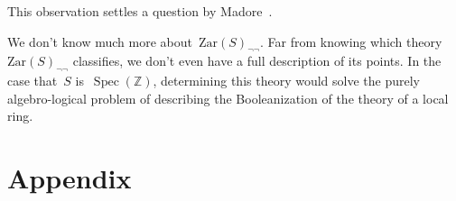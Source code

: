 \documentclass[10pt,reqno,a4paper]{amsbook}
\theoremstyle{definition}
\theoremstyle{plain}
\theoremstyle{remark}
\newcommand{\ZZ}{\mathbb{Z}}
\newcommand{\Zar}{\mathrm{Zar}}
\DeclareMathOperator{\Spec}{Spec}
\newcommand{\?}{\,{:}\,}
\renewcommand{\_}{\mathpunct{.}\,}
\begin{document}
This observation settles a question by
Madore~\cite[entry~2002-03-16:036]{madore:diary}.

We don't know much more about~$\Zar(S)_{\neg\neg}$. Far from knowing which
theory~$\Zar(S)_{\neg\neg}$ classifies, we don't even have a full description
of its points. In the case that~$S$ is~$\Spec(\ZZ)$, determining this theory
would solve the purely algebro-logical problem of describing the
Booleanization of the theory of a local ring.




\chapter*{Appendix}

\setcounter{saved-section-number}{\value{section}}
\end{document}

